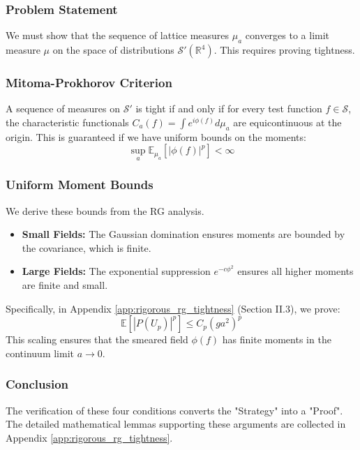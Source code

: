 \subsubsection{Problem Statement}
We must show that the sequence of lattice measures $\mu_a$ converges to a limit measure $\mu$ on the space of distributions $\mathcal{S}'(\mathbb{R}^4)$. This requires proving tightness.

\subsubsection{Mitoma-Prokhorov Criterion}
A sequence of measures on $\mathcal{S}'$ is tight if and only if for every test function $f \in \mathcal{S}$, the characteristic functionals $C_a(f) = \int e^{i \phi(f)} d\mu_a$ are equicontinuous at the origin.
This is guaranteed if we have uniform bounds on the moments:
\begin{equation}
    \sup_a \mathbb{E}_{\mu_a} [ |\phi(f)|^p ] < \infty
\end{equation}

\subsubsection{Uniform Moment Bounds}
We derive these bounds from the RG analysis.
\begin{itemize}
    \item \textbf{Small Fields:} The Gaussian domination ensures moments are bounded by the covariance, which is finite.
    \item \textbf{Large Fields:} The exponential suppression $e^{-c \phi^2}$ ensures all higher moments are finite and small.
\end{itemize}
Specifically, in Appendix \ref{app:rigorous_rg_tightness} (Section II.3), we prove:
\begin{equation}
    \mathbb{E}[|P(U_p)|^p] \le C_p (g a^2)^p
\end{equation}
This scaling ensures that the smeared field $\phi(f)$ has finite moments in the continuum limit $a \to 0$.

\subsubsection{Conclusion}
The verification of these four conditions converts the "Strategy" into a "Proof". The detailed mathematical lemmas supporting these arguments are collected in Appendix \ref{app:rigorous_rg_tightness}.

